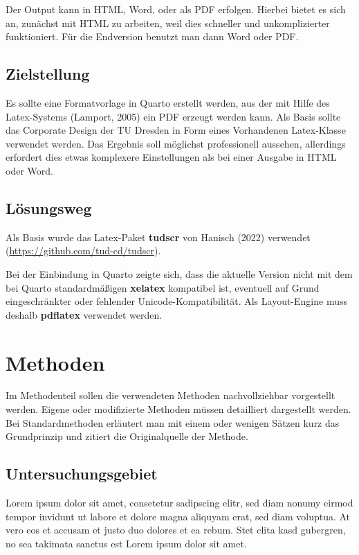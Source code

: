 \documentclass[
  11pt,
  a4paper,
]{tudscrreprt}
\begin{document}
Der Output kann in HTML, Word, oder als PDF erfolgen. Hierbei bietet es
sich an, zunächst mit HTML zu arbeiten, weil dies schneller und
unkomplizierter funktioniert. Für die Endversion benutzt man dann Word
oder PDF.

\section{Zielstellung}\label{zielstellung}

Es sollte eine Formatvorlage in Quarto erstellt werden, aus der mit
Hilfe des Latex-Systems (Lamport, 2005) ein PDF erzeugt werden kann. Als
Basis sollte das Corporate Design der TU Dresden in Form eines
Vorhandenen Latex-Klasse verwendet werden. Das Ergebnis soll möglichst
professionell aussehen, allerdings erfordert dies etwas komplexere
Einstellungen als bei einer Ausgabe in HTML oder Word.

\section{Lösungsweg}\label{luxf6sungsweg}

Als Basis wurde das Latex-Paket \textbf{tudscr} von Hanisch (2022)
verwendet (\url{https://github.com/tud-cd/tudscr}).

Bei der Einbindung in Quarto zeigte sich, dass die aktuelle Version
nicht mit dem bei Quarto standardmäßigen \textbf{xelatex} kompatibel
ist, eventuell auf Grund eingeschränkter oder fehlender
Unicode-Kompatibilität. Als Layout-Engine muss deshalb \textbf{pdflatex}
verwendet werden.

\chapter{Methoden}\label{methoden}

Im Methodenteil sollen die verwendeten Methoden nachvollziehbar
vorgestellt werden. Eigene oder modifizierte Methoden müssen detailliert
dargestellt werden. Bei Standardmethoden erläutert man mit einem oder
wenigen Sätzen kurz das Grundprinzip und zitiert die Originalquelle der
Methode.

\section{Untersuchungsgebiet}\label{untersuchungsgebiet}

Lorem ipsum dolor sit amet, consetetur sadipscing elitr, sed diam nonumy
eirmod tempor invidunt ut labore et dolore magna aliquyam erat, sed diam
voluptua. At vero eos et accusam et justo duo dolores et ea rebum. Stet
clita kasd gubergren, no sea takimata sanctus est Lorem ipsum dolor sit
amet.
\end{document}
